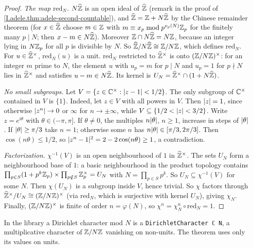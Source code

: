 \begin{theorem}
\end{theorem}
\begin{proof}
\emph{The map $\mathrm{red}_N$.} $N\widehat{\mathbb{Z}}$ is an open ideal of $\widehat{\mathbb{Z}}$ (remark in the proof of
\cref{I.adele.thm:adele-second-countable}), and $\widehat{\mathbb{Z}}=\mathbb{Z}+N\widehat{\mathbb{Z}}$ by the Chinese remainder theorem (for $x\in\widehat{\mathbb{Z}}$ choose $m\in\mathbb{Z}$ with $m\equiv x_p\bmod p^{v_p(N)}\mathbb{Z}_p$ for the finitely many $p\mid N$; then $x-m\in N\widehat{\mathbb{Z}}$). Moreover $\mathbb{Z}\cap N\widehat{\mathbb{Z}}=N\mathbb{Z}$, because an integer lying in $N\mathbb{Z}_p$
for all $p$ is divisible by $N$. So $\widehat{\mathbb{Z}}/N\widehat{\mathbb{Z}}\cong\mathbb{Z}/N\mathbb{Z}$, which defines $\mathrm{red}_N$. For $u\in\widehat{\mathbb{Z}}^\times$,
$\mathrm{red}_N(u)$ is a unit. $\mathrm{red}_N$ restricted to $\widehat{\mathbb{Z}}^\times$ is onto $(\mathbb{Z}/N\mathbb{Z})^\times$: for an integer $m$
prime to $N$, the element $u$ with $u_p=m$ for $p\mid N$ and $u_p=1$ for $p\nmid N$ lies in $\widehat{\mathbb{Z}}^\times$ and satisfies
$u-m\in N\widehat{\mathbb{Z}}$. Its kernel is $U_N=\widehat{\mathbb{Z}}^\times\cap(1+N\widehat{\mathbb{Z}})$.

\emph{No small subgroups.} Let $V=\{z\in\mathbb{C}^\times:\lvert z-1\rvert<1/2\}$. The only subgroup of $\mathbb{C}^\times$ contained in $V$
is $\{1\}$. Indeed, let $z\in V$ with all powers in $V$. Then $\lvert z\rvert=1$, since otherwise $\lvert z^n\rvert\to0$ or $\infty$
for $n\to\pm\infty$, while $V\subseteq\{1/2<\lvert z\rvert<3/2\}$. Write $z=e^{i\theta}$ with $\theta\in(-\pi,\pi]$. If
$\theta\neq0$, the multiples $n\lvert\theta\rvert$, $n\ge1$, increase in steps of $\lvert\theta\rvert$. If $\lvert\theta\rvert\ge\pi/3$ take
$n=1$; otherwise some $n$ has $n\lvert\theta\rvert\in[\pi/3,2\pi/3]$. Then $\cos(n\theta)\le1/2$, so
$\lvert z^n-1\rvert^2=2-2\cos(n\theta)\ge1$, a contradiction.

\emph{Factorization.} $\chi^{-1}(V)$ is an open neighbourhood of $1$ in $\widehat{\mathbb{Z}}^\times$. The sets $U_N$ form a
neighbourhood base of $1$: a basic neighbourhood in the product topology contains
$\prod_{p\in S}(1+p^k\mathbb{Z}_p)\times\prod_{p\notin S}\mathbb{Z}_p^\times=U_N$ with $N=\prod_{p\in S}p^k$. So $U_N\subseteq\chi^{-1}(V)$
for some $N$. Then $\chi(U_N)$ is a subgroup inside $V$, hence trivial. So $\chi$ factors through
$\widehat{\mathbb{Z}}^\times/U_N\cong(\mathbb{Z}/N\mathbb{Z})^\times$ (via $\mathrm{red}_N$, which is surjective with kernel $U_N$), giving $\chi_N$. Finally,
$(\mathbb{Z}/N\mathbb{Z})^\times$ is finite of order $n=\varphi(N)$, so $\chi^n=\chi_N^n\circ\mathrm{red}_N=1$.
\end{proof}
\noindent In the library a Dirichlet character mod $N$ is a \texttt{DirichletCharacter ℂ N}, a multiplicative character of
$\mathbb{Z}/N\mathbb{Z}$ vanishing on non-units. The theorem uses only its values on units.

